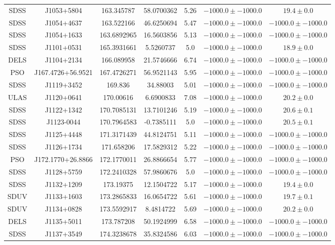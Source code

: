 \begin{table}
\begin{tabular}{ccccccc}
SDSS & J1053+5804 & 163.345787 & 58.0700362 & 5.26 & $-1000.0\pm-1000.0$ & $  19.4\pm  0.0$ \\
SDSS & J1054+4637 & 163.522166 & 46.6250694 & 5.47 & $-1000.0\pm-1000.0$ & $-1000.0\pm-1000.0$ \\
SDSS & J1054+1633 & 163.6892965 & 16.5603856 & 5.13 & $-1000.0\pm-1000.0$ & $-1000.0\pm-1000.0$ \\
SDSS & J1101+0531 & 165.3931661 & 5.5260737 & 5.0 & $-1000.0\pm-1000.0$ & $  18.9\pm  0.0$ \\
DELS & J1104+2134 & 166.089958 & 21.5746666 & 6.74 & $-1000.0\pm-1000.0$ & $-1000.0\pm-1000.0$ \\
PSO & J167.4726+56.9521 & 167.4726271 & 56.9521143 & 5.95 & $-1000.0\pm-1000.0$ & $-1000.0\pm-1000.0$ \\
SDSS & J1119+3452 & 169.836 & 34.88003 & 5.01 & $-1000.0\pm-1000.0$ & $-1000.0\pm-1000.0$ \\
ULAS & J1120+0641 & 170.00616 & 6.6900833 & 7.08 & $-1000.0\pm-1000.0$ & $  20.2\pm  0.0$ \\
SDSS & J1122+1342 & 170.7085131 & 13.7101246 & 5.19 & $-1000.0\pm-1000.0$ & $  20.6\pm  0.1$ \\
SDSS & J1123-0044 & 170.7964583 & -0.7385111 & 5.0 & $-1000.0\pm-1000.0$ & $  20.5\pm  0.1$ \\
SDSS & J1125+4448 & 171.3171439 & 44.8124751 & 5.11 & $-1000.0\pm-1000.0$ & $-1000.0\pm-1000.0$ \\
SDSS & J1126+1734 & 171.658206 & 17.5829312 & 5.22 & $-1000.0\pm-1000.0$ & $-1000.0\pm-1000.0$ \\
PSO & J172.1770+26.8866 & 172.1770011 & 26.8866654 & 5.77 & $-1000.0\pm-1000.0$ & $-1000.0\pm-1000.0$ \\
SDSS & J1128+5759 & 172.2410328 & 57.9860676 & 5.0 & $-1000.0\pm-1000.0$ & $-1000.0\pm-1000.0$ \\
SDSS & J1132+1209 & 173.19375 & 12.1504722 & 5.17 & $-1000.0\pm-1000.0$ & $  19.4\pm  0.0$ \\
SDUV & J1133+1603 & 173.2865833 & 16.0654722 & 5.61 & $-1000.0\pm-1000.0$ & $  19.7\pm  0.1$ \\
SDUV & J1134+0828 & 173.5592917 & 8.4814722 & 5.69 & $-1000.0\pm-1000.0$ & $  20.2\pm  0.0$ \\
DELS & J1135+5011 & 173.787208 & 50.1924999 & 6.58 & $-1000.0\pm-1000.0$ & $-1000.0\pm-1000.0$ \\
SDSS & J1137+3549 & 174.3238678 & 35.8324586 & 6.03 & $-1000.0\pm-1000.0$ & $-1000.0\pm-1000.0$ \\

\end{tabular}
\end{table}
